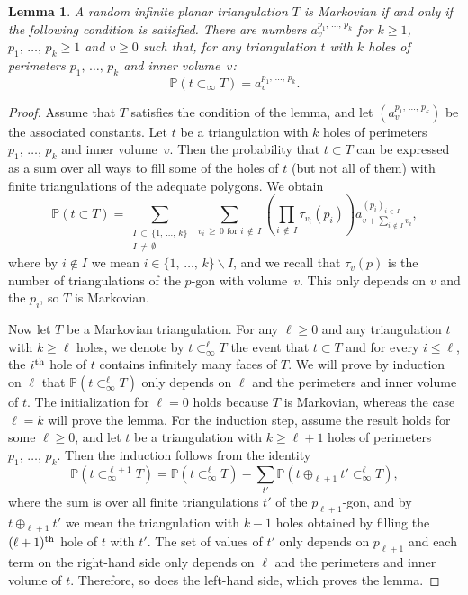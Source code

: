 \documentclass[10pt]{amsart}
\newtheorem{lemm}[theo]{Lemma}\newtheorem{prop}[theo]{Proposition}\newtheorem{coro}[theo]{Corollary}\newtheorem{conj}[theo]{Conjecture}
\theoremstyle{definition}\newtheorem{defi}[theo]{Definition}\newtheorem{rema}[theo]{Remark}\newtheorem{exam}[theo]{Example}\newtheorem{exem}[theo]{Example}\newtheorem{nota}[theo]{Notation}
\renewcommand{\P}{\mathbb{P}}
\begin{document}
\begin{lemm}\label{lem_equivalence_weak_Markov}
A random infinite planar triangulation $T$ is Markovian if and only if the following condition is satisfied. There are numbers $a^{p_1,\,\dots,\, p_k}_v$ for $k \geq 1$, $p_1,\,\dots,\,p_k \geq 1$ and $v \geq 0$ such that, for any triangulation $t$ with $k$ holes of perimeters $p_1,\,\dots,\, p_k$ and inner volume~$v$:
\[
\P \left(t \subset_{\infty} T \right) = a^{p_1,\, \dots,\,p_k}_v.
\]
\end{lemm}

\begin{proof}
Assume that $T$ satisfies the condition of the lemma, and let $(a^{p_1,\,\dots,\, p_k}_v )$ be the associated constants. Let $t$ be a triangulation with $k$ holes of perimeters $p_1,\, \dots,\, p_k$ and inner volume~$v$. Then the probability that $t \subset T$ can be expressed as a sum over all ways to fill some of the holes of $t$ (but not all of them) with finite triangulations of the adequate polygons. We obtain
\[
\P \left(t \subset T \right) = \sum_{\substack{I\, \subset\,\{1,\,\dots,\,k\}\\
I\,\ne\,\emptyset}}\: \sum_{v_i\,\geq\,0 \text{ for } i\,\notin\,I} \left(\prod_{i\,\notin\,I} \tau_{v_i}(p_i) \right) a_{v + \sum\limits_{i\,\notin\,I} v_i}^{\left(p_i \right)_{i\,\in\,I}},
\]
where by $i \notin I$ we mean $i \in \{1,\,\dots,\,k\} \backslash I$, and we recall that $\tau_v(p)$ is the number of triangulations of the $p$-gon with volume~$v$. This only depends on $v$ and the $p_i$, so $T$ is Markovian.

Now let $T$ be a Markovian triangulation. For any $\ell \geq 0$ and any triangulation $t$ with $k \geq \ell$ holes, we denote by $t \subset_{\infty}^{\ell} T$ the event that $t \subset T$ and for every $i \leq \ell$, the $i^{\rm th}$ hole of $t$ contains infinitely many faces of $T$. We will prove by induction on $\ell$ that $\P (t \subset_{\infty}^{\ell} T)$ only depends on $\ell$ and the perimeters and inner volume of $t$. The initialization for $\ell=0$ holds because $T$ is Markovian, whereas the case $\ell=k$ will prove the lemma. For the induction step, assume the result holds for some $\ell \geq 0$, and let $t$ be a triangulation with $k \geq \ell+1$ holes of perimeters $p_1,\,\dots,\,p_k$. Then the induction follows from the identity
\[
\P \left(t \subset_{\infty}^{\ell+1} T \right) = \P \left(t \subset_{\infty}^{\ell} T \right) - \sum_{t'} \P \left(t \oplus_{\ell+1} t' \subset_{\infty}^{\ell} T \right),
\]
where the sum is over all finite triangulations $t'$ of the $p_{\ell+1}$-gon, and by $t \oplus_{\ell+1} t'$ we mean the triangulation with $k-1$ holes obtained by filling the $(\ell+1)^{\rm th}$ hole of $t$ with $t'$. The set of values of $t'$ only depends on $p_{\ell+1}$ and each term on the right-hand side only depends on $\ell$ and the perimeters and inner volume of $t$. Therefore, so does the left-hand side, which proves the lemma.
\end{proof}
\end{document}
